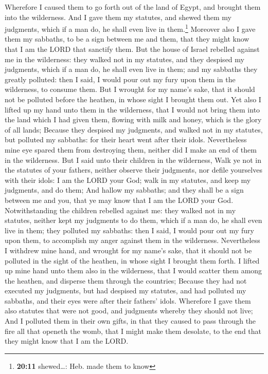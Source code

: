  Wherefore I caused them to go forth out of the land of
Egypt, and brought them into the wilderness.  And I gave
them my statutes, and shewed them my judgments, which if a man do, he
shall even live in them.\footnote{\textbf{20:11} shewed\ldots: Heb. made
  them to know}  Moreover also I gave them my sabbaths,
to be a sign between me and them, that they might know that I am the
LORD that sanctify them.  But the house of Israel
rebelled against me in the wilderness: they walked not in my statutes,
and they despised my judgments, which if a man do, he shall even live in
them; and my sabbaths they greatly polluted: then I said, I would pour
out my fury upon them in the wilderness, to consume them.
 But I wrought for my name's sake, that it should not be
polluted before the heathen, in whose sight I brought them out.
 Yet also I lifted up my hand unto them in the
wilderness, that I would not bring them into the land which I had given
them, flowing with milk and honey, which is the glory of all lands;
 Because they despised my judgments, and walked not in my
statutes, but polluted my sabbaths: for their heart went after their
idols.  Nevertheless mine eye spared them from destroying
them, neither did I make an end of them in the wilderness.
 But I said unto their children in the wilderness, Walk
ye not in the statutes of your fathers, neither observe their judgments,
nor defile yourselves with their idols:  I am the LORD
your God; walk in my statutes, and keep my judgments, and do them;
 And hallow my sabbaths; and they shall be a sign between
me and you, that ye may know that I am the LORD your God.
 Notwithstanding the children rebelled against me: they
walked not in my statutes, neither kept my judgments to do them, which
if a man do, he shall even live in them; they polluted my sabbaths: then
I said, I would pour out my fury upon them, to accomplish my anger
against them in the wilderness.  Nevertheless I withdrew
mine hand, and wrought for my name's sake, that it should not be
polluted in the sight of the heathen, in whose sight I brought them
forth.  I lifted up mine hand unto them also in the
wilderness, that I would scatter them among the heathen, and disperse
them through the countries;  Because they had not
executed my judgments, but had despised my statutes, and had polluted my
sabbaths, and their eyes were after their fathers' idols.
 Wherefore I gave them also statutes that were not good,
and judgments whereby they should not live;  And I
polluted them in their own gifts, in that they caused to pass through
the fire all that openeth the womb, that I might make them desolate, to
the end that they might know that I am the LORD.


